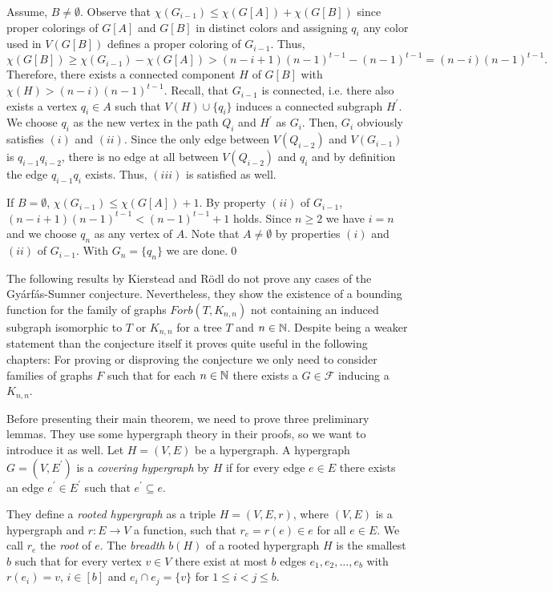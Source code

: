 \begin{prf}
Assume, $B\neq\emptyset$. Observe that $\chi (G_{i-1})\leq \chi (G[A]) + \chi (G[B])$ since proper colorings of $G[A]$ and $G[B]$ in distinct colors and assigning $q_i$ any color used in $V(G[B])$ defines a proper coloring of $G_{i-1}$. Thus, \[\chi (G[B])\geq \chi (G_{i-1})-\chi (G[A])>(n-i+1)(n-1)^{t-1}-(n-1)^{t-1}=(n-i)(n-1)^{t-1}.\]
Therefore, there exists a connected component $H$ of $G[B]$ with $\chi (H)>(n-i)(n-1)^{t-1}$. Recall, that $G_{i-1}$ is connected, i.e. there also exists a vertex $q_i\in A$ such that $V(H)\cup \{q_i\}$ induces a connected subgraph $H^\prime$. We choose $q_i$ as the new vertex in the path $Q_i$ and $H^\prime$ as $G_i$. Then, $G_i$ obviously satisfies $(i)$ and $(ii)$. Since the only edge between $V(Q_{i-2})$ and $V(G_{i-1})$ is $q_{i-1}q_{i-2}$, there is no edge at all between $V(Q_{i-2})$ and $q_i$ and by definition the edge $q_{i-1}q_i$ exists. Thus, $(iii)$ is satisfied as well. 

If $B=\emptyset$, $\chi (G_{i-1})\leq \chi (G[A]) + 1$. By property $(ii)$ of $G_{i-1}$, $(n-i+1)(n-1)^{t-1} < (n-1)^{t-1} +1$ holds. Since $n\geq 2$ we have $i=n$ and we choose $q_n$ as any vertex of $A$. Note that $A\neq\emptyset$ by properties $(i)$ and $(ii)$ of $G_{i-1}$. With $G_n=\{q_n\}$ we are done.\qed
\end{prf}

The following results by Kierstead and Rödl \cite{Ki96} do not prove any cases of the Gyárfás-Sumner conjecture. Nevertheless, they show the existence of a bounding function for the family of graphs $\textit{Forb}(T,K_{n,n})$ not containing an induced subgraph isomorphic to $T$ or $K_{n,n}$ for a tree $T$ and $n\in\mathbb{N}$. Despite being a weaker statement than the conjecture itself it proves quite useful in the following chapters: For proving or disproving the conjecture we only need to consider families of graphs $F$ such that for each $n\in\mathbb{N}$ there exists a $G\in\mathcal{F}$ inducing a $K_{n,n}$.

Before presenting their main theorem, we need to prove three preliminary lemmas. They use some hypergraph theory in their proofs, so we want to introduce it as well. Let $H=(V,E)$ be a hypergraph. A hypergraph $G=(V,E^\prime)$ is a \textit{covering hypergraph} by $H$ if for every edge $e\in E$ there exists an edge $e^\prime\in E^\prime$ such that $e^\prime\subseteq e$. 

They define a \textit{rooted hypergraph} as a triple $H=(V,E,r)$, where $(V,E)$ is a hypergraph and $r:E\to V$ a function, such that $r_e=r(e)\in e$ for all $e\in E$. We call $r_e$ the \textit{root} of $e$. The \textit{breadth} $b(H)$ of a rooted hypergraph $H$ is the smallest $b$ such that for every vertex $v\in V$ there exist at most $b$ edges $e_1,e_2,\dots ,e_b$ with $r(e_i)=v$, $i\in [b]$ and $e_i\cap e_j= \{v\}$ for $1\leq i<j\leq b$.

